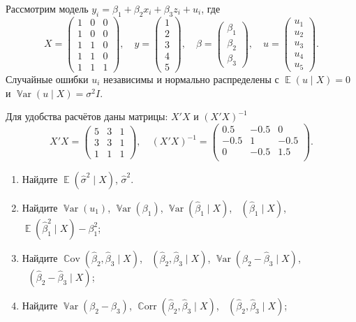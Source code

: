\documentclass[12pt]{article}
\DeclareMathOperator{\Cov}{\mathbb{C}ov}
\DeclareMathOperator{\Corr}{\mathbb{C}orr}
\DeclareMathOperator{\Var}{\mathbb{V}ar}
\DeclareMathOperator{\hVar}{\widehat{\Var}}
\DeclareMathOperator{\hCov}{\widehat{\Cov}}
\DeclareMathOperator{\hCorr}{\widehat{\Corr}}
\DeclareMathOperator{\E}{\mathbb{E}}
\newcommand{\hb}{\hat{\beta}}
\newcommand{\hs}{\hat{\sigma}}
\begin{document}
\begin{problem}
Рассмотрим модель $y_i = \beta_1 + \beta_2 x_i + \beta_3 z_i + u_i$, 
 где
\[
X = \begin{pmatrix} 
  1 & 0 & 0 \\ 
  1 & 0 & 0 \\ 
  1 & 1 & 0 \\ 
  1 & 1 & 0 \\ 
  1 & 1 & 1 
\end{pmatrix}, \quad
y = \begin{pmatrix} 1 \\ 2 \\ 3 \\ 4 \\ 5 \end{pmatrix}, \quad
\beta = \begin{pmatrix} \beta_1 \\ \beta_2 \\ \beta_3 \end{pmatrix}, \quad
u = \begin{pmatrix} u_1 \\ u_2 \\ u_3 \\ u_4 \\ u_5  \end{pmatrix}.
\]
Случайные ошибки $u_i$ независимы и нормально распределены с
$\E(u \mid X) = 0$ и $\Var(u \mid X) = \sigma^2 I$. 

Для удобства расчётов даны матрицы: $X'X$ и $(X'X)^{-1}$ 
\[
X'X = \begin{pmatrix} 
  5 & 3 & 1 \\ 
  3 & 3 & 1\\ 
  1 & 1 & 1 
\end{pmatrix}, \quad
(X' X)^{-1} =  \begin{pmatrix}
  0.5 & -0.5 & 0 \\
  -0.5 & 1 & -0.5 \\
  0 & -0.5 & 1.5 \\
  \end{pmatrix}.
\]


\begin{enumerate}
\item Найдите $\E (\hs^2 \mid X)$, $\hs^2$.
\item Найдите  $\Var (u_1)$, $\Var (\beta_1)$, $\Var (\hb_1 \mid X)$, $\hVar(\hb_1 \mid X)$, $\E (\hb_1^2 \mid X) - \beta_1^2$;
\item Найдите  $\Cov (\hb_2, \hb_3 \mid X)$, $\hCov(\hb_2, \hb_3 \mid X)$, $\Var (\hb_2 - \hb_3 \mid X)$, $\hVar(\hb_2 - \hb_3 \mid X)$;
\item Найдите  $\Var (\beta_2 - \beta_3)$, $\Corr (\hb_2, \hb_3 \mid X)$, $\hCorr(\hb_2, \hb_3 \mid X)$;
\end{enumerate}


\end{problem}
\end{document}
